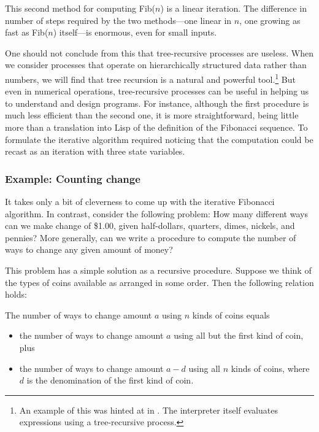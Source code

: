 This second method for computing Fib(\( n \)) is a linear iteration.  The
difference in number of steps required by the two methods---one linear in
\( n \), one growing as fast as Fib(\( n \)) itself---is enormous, even for
small inputs.

One should not conclude from this that tree-recursive processes are useless.
When we consider processes that operate on hierarchically structured data
rather than numbers, we will find that tree recursion is a natural and powerful
tool.\footnote{An example of this was hinted at in . The
interpreter itself evaluates expressions using a tree-recursive process.} But
even in numerical operations, tree-recursive processes can be useful in helping
us to understand and design programs.  For instance, although the first
 procedure is much less efficient than the second one, it is more
straightforward, being little more than a translation into Lisp of the
definition of the Fibonacci sequence.  To formulate the iterative algorithm
required noticing that the computation could be recast as an iteration with
three state variables.

\subsubsection*{Example: Counting change}

It takes only a bit of cleverness to come up with the iterative Fibonacci
algorithm.  In contrast, consider the following problem: How many different
ways can we make change of \$1.00, given half-dollars, quarters, dimes,
nickels, and pennies?  More generally, can we write a procedure to compute the
number of ways to change any given amount of money?

This problem has a simple solution as a recursive procedure.  Suppose we think
of the types of coins available as arranged in some order.  Then the following
relation holds:

\begin{niceQuote}
The number of ways to change amount \( a \) using \( n \) kinds of coins equals
\begin{itemize}
\item
the number of ways to change amount \( a \) using all but the first kind of coin,
plus
\item
the number of ways to change amount \( a - d \) using all \( n \) kinds of
coins, where \( d \) is the denomination of the first kind of coin.
\end{itemize}
\end{niceQuote}

